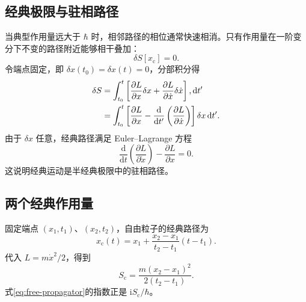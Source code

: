 \subsection{经典极限与驻相路径}
当典型作用量远大于 $\hbar$ 时，相邻路径的相位通常快速相消。只有作用量在一阶变分下不变的路径附近能够相干叠加：
\begin{equation}
\delta S\left[x_{\mathrm c}\right]=0.
\end{equation}
令端点固定，即 $\delta x\left(t_0\right)=\delta x\left(t\right)=0$，分部积分得
\begin{align}
\delta S
&=\int_{t_0}^{t}\left[
\frac{\partial L}{\partial x}\delta x
+\frac{\partial L}{\partial\dot x}\delta\dot x\right],\mathrm{d}t'\notag\\
&=\int_{t_0}^{t}\left[
\frac{\partial L}{\partial x}-\frac{\mathrm{d}}{\mathrm{d}t'}
\left(\frac{\partial L}{\partial\dot x}\right)\right]\delta x\,\mathrm{d}t'.
\end{align}
由于 $\delta x$ 任意，经典路径满足 Euler--Lagrange 方程
\begin{equation}
\boxed{\frac{\mathrm{d}}{\mathrm{d}t}
\left(\frac{\partial L}{\partial\dot x}\right)-\frac{\partial L}{\partial x}=0.}
\end{equation}
这说明经典运动是半经典极限中的驻相路径。

\subsection{两个经典作用量}
\begin{example}[自由粒子]
固定端点 $\left(x_1,t_1\right)$、$\left(x_2,t_2\right)$，自由粒子的经典路径为
\begin{equation}
x_{\mathrm c}\left(t\right)=x_1+
\frac{x_2-x_1}{t_2-t_1}\left(t-t_1\right).
\end{equation}
代入 $L=m\dot x^2/2$，得到
\begin{equation}
\boxed{S_{\mathrm c}=
\frac{m\left(x_2-x_1\right)^2}{2\left(t_2-t_1\right)}.}
\end{equation}
式\eqref{eq:free-propagator}的指数正是 $\mathrm{i}S_{\mathrm c}/\hbar$。
\end{example}

